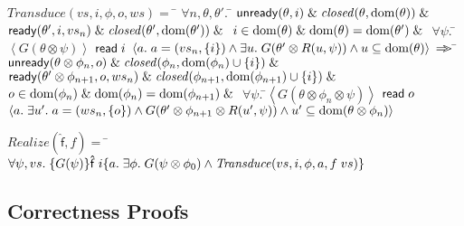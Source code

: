 \begin{specification}
\nextline $\mathit{Transduce}(vs, i, \phi, o, ws)  =  $
\nextline\;\;\= $\forall n, \theta, \theta'.$ 
\nextline\qquad\= $\mathsf{unready}({\theta}, {i}) \;\&\; \mathit{closed}(\theta, \mbox{dom}({\theta})) \;\&\; $ 
\nextline\> $\mathsf{ready}({\theta'}, {i}, {vs_n}) \;\&\; \mathit{closed}(\theta', \mbox{dom}({\theta'})) \;\&\;$
\nextline\> $i \in \mbox{dom}({\theta}) \;\&\; \mbox{dom}({\theta}) = \mbox{dom}({\theta'}) \;\&\;$ 
\nextline\> $\forall \psi.\;$\=$\left<G(\theta \otimes \psi)\right>$ 
\nextline\>\> $\mathsf{read}\; i$
\nextline\>\> $\left<a.\;a = (vs_n, \{{i}\}) \land \exists u.\; G(\theta' \otimes R(u,\psi)) \land u \subseteq \mbox{dom}({\theta}) \right>$ 
\nextline\> $\Rightarrow\!\!\!>$ 
\nextline\qquad\= $\mathsf{unready}({\theta \otimes \phi_n}, {o}) \;\&\; \mathit{closed}(\phi_n, \mbox{dom}({\phi_n}) \cup \{{i}\}) \;\&\; $ 
\nextline\> $\mathsf{ready}({\theta' \otimes \phi_{n+1}}, {o}, {ws_n}) \;\&\; \mathit{closed}(\phi_{n+1}, \mbox{dom}({\phi_{n+1}}) \cup \{{i}\}) \;\&\;$
\nextline\> $o \in \mbox{dom}({\phi_n}) \;\&\; \mbox{dom}({\phi_n}) = \mbox{dom}({\phi_{n+1}}) \;\&\;$ 
\nextline\> $\forall \psi.\;$\=$\left<G(\theta \otimes \phi_n \otimes \psi)\right>$ 
\nextline\>\>$\mathsf{read}\; o$ 
\nextline\>\>$\left<a.\;\exists u'.\;a = (ws_n, \{{o}\}) \land 
                        G(\theta' \otimes \phi_{n+1} \otimes R(u', \psi)) \land u' \subseteq \mbox{dom}({\theta \otimes \phi_n})\right>$ 
\end{specification}

\begin{specification}
\nextline $\mathit{Realize}(\mathsf{\hat{f}}, f) = $ 
\nextline\;\;\= $\forall \psi, vs.\; \{{G(\psi)}\}{\mathsf{\hat{f}}\;i}\{{a}.\;{\exists \phi.\;G(\psi \otimes \phi_0) \land \mathit{Transduce}(vs, i, \phi, a, f\;vs)}\}$
\end{specification}

\subsection{Correctness Proofs}

